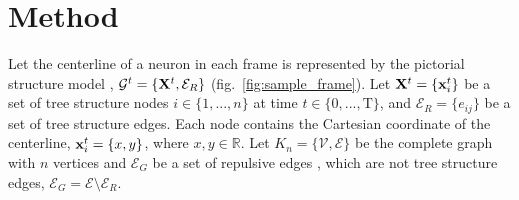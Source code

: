 \documentclass{article}
\begin{document}
\section{Method}
Let the centerline of a neuron in each frame is represented by the pictorial structure model \cite{Fischler1973, Felzenszwalb2005}, $\mathcal{G}^t=\{{\bf X}^t, \mathcal{E}_R\}$ (fig.~\ref{fig:sample_frame}). Let ${\bf X}^t = \{{\bf x}_i^t\}$ be a set of tree structure nodes $i \in \{1,...,n\}$ at time $t \in \{0,...,\mathrm{T}\}$, and $\mathcal{E}_R = \{e_{ij}\}$ be a set of tree structure edges. Each node contains the Cartesian coordinate of the centerline, ${\bf x}_i^t = \{x,y\}$, where $x,y \in \mathbb{R}$. Let $K_n = \{ \mathcal{V}, \mathcal{E} \}$ be the complete graph with $n$ vertices and $\mathcal{E}_G$ be a set of repulsive edges \cite{Ferrari2009}, which are not tree structure edges, $\mathcal{E}_G = \mathcal{E} \setminus \mathcal{E}_R$.
\end{document}
